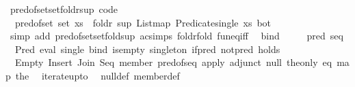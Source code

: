 \begin{isabellebody}
\isamarkupfalse%
%
\endisatagproof
{\isafoldproof}%
%
\isadelimproof
\isanewline
%
\endisadelimproof
\isanewline
{}\isamarkupfalse%
\ pred{\isacharunderscore}{\kern0pt}of{\isacharunderscore}{\kern0pt}set{\isacharunderscore}{\kern0pt}set{\isacharunderscore}{\kern0pt}foldr{\isacharunderscore}{\kern0pt}sup\ {\isacharbrackleft}{\kern0pt}code{\isacharbrackright}{\kern0pt}{\isacharcolon}{\kern0pt}\isanewline
\ \ {\isachardoublequoteopen}pred{\isacharunderscore}{\kern0pt}of{\isacharunderscore}{\kern0pt}set\ {\isacharparenleft}{\kern0pt}set\ xs{\isacharparenright}{\kern0pt}\ {\isacharequal}{\kern0pt}\ foldr\ sup\ {\isacharparenleft}{\kern0pt}List{\isachardot}{\kern0pt}map\ Predicate{\isachardot}{\kern0pt}single\ xs{\isacharparenright}{\kern0pt}\ bot{\isachardoublequoteclose}\isanewline
%
\isadelimproof
\ \ %
\endisadelimproof
%
\isatagproof
{}\isamarkupfalse%
\ {\isacharparenleft}{\kern0pt}simp\ add{\isacharcolon}{\kern0pt}\ pred{\isacharunderscore}{\kern0pt}of{\isacharunderscore}{\kern0pt}set{\isacharunderscore}{\kern0pt}set{\isacharunderscore}{\kern0pt}fold{\isacharunderscore}{\kern0pt}sup\ ac{\isacharunderscore}{\kern0pt}simps\ foldr{\isacharunderscore}{\kern0pt}fold\ fun{\isacharunderscore}{\kern0pt}eq{\isacharunderscore}{\kern0pt}iff{\isacharparenright}{\kern0pt}%
\endisatagproof
{\isafoldproof}%
%
\isadelimproof
\isanewline
%
\endisadelimproof
\isanewline
{}\isamarkupfalse%
\isanewline
\ \ bind\ {\isacharparenleft}{\kern0pt}\ {\isachardoublequoteopen}{\isasymbind}{\isachardoublequoteclose}\ {}{}{\isacharparenright}{\kern0pt}\isanewline
\isanewline
{}\isamarkupfalse%
\ {\isacharparenleft}{\kern0pt}\ pred\ seq\isanewline
{}\isamarkupfalse%
\ {\isacharparenleft}{\kern0pt}\ Pred\ eval\ single\ bind\ is{\isacharunderscore}{\kern0pt}empty\ singleton\ if{\isacharunderscore}{\kern0pt}pred\ not{\isacharunderscore}{\kern0pt}pred\ holds\isanewline
\ \ Empty\ Insert\ Join\ Seq\ member\ pred{\isacharunderscore}{\kern0pt}of{\isacharunderscore}{\kern0pt}seq\ {\isachardoublequoteopen}apply{\isachardoublequoteclose}\ adjunct\ null\ the{\isacharunderscore}{\kern0pt}only\ eq\ map\ the\isanewline
\ \ iterate{\isacharunderscore}{\kern0pt}upto\isanewline
{}\isamarkupfalse%
\ {\isacharparenleft}{\kern0pt}\ null{\isacharunderscore}{\kern0pt}def\ member{\isacharunderscore}{\kern0pt}def\isanewline
%
\isadelimtheory
\isanewline
%
\endisadelimtheory
%
\isatagtheory
{}\isamarkupfalse%
%
\endisatagtheory
{\isafoldtheory}%
%
\isadelimtheory
%
\endisadelimtheory
%
\end{isabellebody}%
